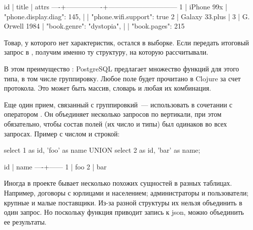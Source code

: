 \begin{english}
  \begin{text}
 id |     title      |             attrs
----+----------------+------------------------------
  1 | iPhone 99x     | {"phone.display.diag": 145,
    |                |  "phone.wifi.support": true}
  2 | Galaxy 33.plus |
  3 | G. Orwell 1984 | {"book.genre": "dystopia",
    |                |  "book.pages": 215}
  \end{text}
\end{english}

Товар, у которого нет характеристик, остался в выборке. Если передать итоговый запрос в , получим именно ту структуру, на которую рассчитывали.

В этом преимущество : PostgreSQL предлагает множество функций для этого типа, в том числе группировку. Любое поле  будет прочитано в Clojure за счет протокола. Это может быть массив, словарь и любая их комбинация.

Еще один прием, связанный с группировкий~--- использовать  в сочетании с оператором . Он объединяет несколько запросов по вертикали, при этом обязательно, чтобы состав полей (их число и типы) был одинаков во всех запросах. Пример с числом и строкой:

\begin{english}
  \begin{sql}
select 1 as id, 'foo' as name
UNION
select 2 as id, 'bar' as name;
  \end{sql}
\end{english}


\begin{english}
  \begin{text}
 id | name
----+------
  1 | foo
  2 | bar
  \end{text}
\end{english}

Иногда в проекте бывает несколько похожих сущностей в разных таблицах. Например, договоры с юрлицами и населением; администраторы и пользователи; крупные и малые поставщики. Из-за разной структуры их нельзя объединить в один запрос. Но поскольку функция  приводит запись к json, можно объединить ее результаты.

